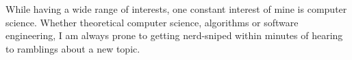 \documentclass[9pt]{developercv} %
\begin{document}
\vspace{0.6cm}



\begin{minipage}[t]{0.5\textwidth} %
	\vspace{-\baselineskip} %
    While having a wide range of interests, one constant interest of mine is computer science. Whether theoretical computer science, algorithms or software engineering, I am always prone to getting nerd-sniped within minutes of hearing to ramblings about a new topic. 
\end{minipage}
\hfill %
\begin{minipage}[t]{0.4\textwidth} %
	\vspace{-\baselineskip} %
	\begin{barchart}{5.5}
	\end{barchart}
\end{minipage}





\end{document}

